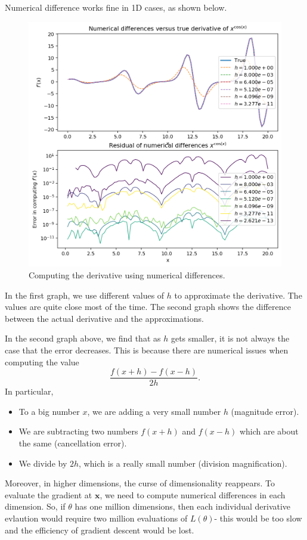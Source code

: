 \documentclass[a4paper, openany]{memoir}
\begin{document}
Numerical difference works fine in 1D cases, as shown below.
\begin{figure}[H]
    \centering
    \includegraphics[scale=0.5]{src/4.28 Error in computing f(x).png}
    \caption{Computing the derivative using numerical differences.}
\end{figure}
\noindent In the first graph, we use different values of $h$ to approximate the derivative. The values are quite close most of the time. The second graph shows the difference between the actual derivative and the approximations. 

In the second graph above, we find that as $h$ gets smaller, it is not always the case that the error decreases. This is because there are numerical issues when computing the value
\[\frac{f(x+h) - f(x-h)}{2h}.\]
In particular,
\begin{itemize}
    \item To a big number $x$, we are adding a very small number $h$ (magnitude error).
    \item We are subtracting two numbers $f(x+h)$ and $f(x-h)$ which are about the same (cancellation error).
    \item We divide by $2h$, which is a really small number (division magnification).
\end{itemize}

Moreover, in higher dimensions, the curse of dimensionality reappears. To evaluate the gradient at $\mathbf{x}$, we need to compute numerical differences in each dimension. So, if $\theta$ has one million dimensions, then each individual derivative evlaution would require two million evaluations of $L(\theta)$- this would be too slow and the efficiency of gradient descent would be lost.
\end{document}
